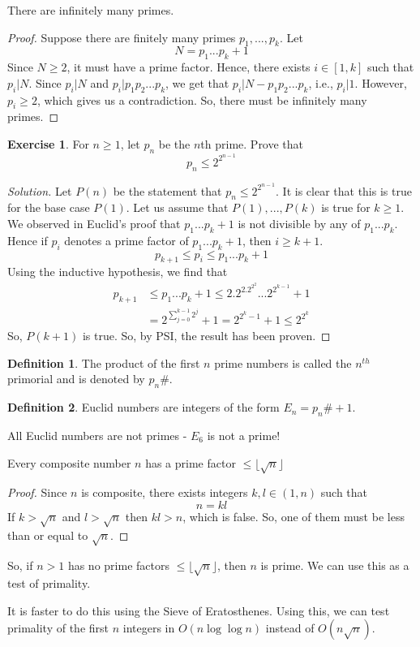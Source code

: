 \documentclass[12pt,letterpaper]{amsbook}
\theoremstyle{definition}
\newtheorem{definition}{Definition} %
\newtheorem*{exercise}{Exercise}
\newenvironment{solution}
  {\renewcommand\qedsymbol{$\blacksquare$}\begin{proof}[Solution]}
  {\end{proof}}
\begin{document}
\begin{theorem}[Euclid]
  There are infinitely many primes.  
\end{theorem}

\begin{proof}
  Suppose there are finitely many primes $p_1,...,p_k$. Let
  \[N = p_1...p_k + 1\]
  Since $N \geq 2$, it must have a prime factor. Hence, there exists $i \in [1,k]$ such that $p_i | N$. Since $p_i|N$ and $p_i|p_1p_2...p_k$, we get that $p_i|N-p_1p_2...p_k$, i.e., $p_i|1$. However, $p_i \geq 2$, which gives us a contradiction. So, there must be infinitely many primes.
\end{proof}

\begin{exercise}
  For $n \geq 1$, let $p_n$ be the $n$th prime. Prove that
  \[p_n \leq 2^{2^{n-1}}\]
\end{exercise}

\begin{solution}
  Let $P(n)$ be the statement that $p_n \leq 2^{2^{n-1}}$. It is clear that this is true for the base case $P(1)$. Let us assume that $P(1),...,P(k)$ is true for $k \geq 1$.
  We observed in Euclid's proof that $p_1...p_k+1$ is not divisible by any of $p_1...p_k$. Hence if $p_i$ denotes a prime factor of $p_1...p_k+1$, then $i \geq k+1$.
  \[p_{k+1} \leq p_i \leq p_1...p_k+1\]
  Using the inductive hypothesis, we find that
  \begin{align*}
    p_{k+1} &\leq p_1...p_k+1 \leq 2.2^2.2^{2^2}...2^{2^{k-1}}+1 \\
            &= 2^{\sum_{j=0}^{k-1} 2^j}+1 = 2^{2^k-1}+1 \leq 2^{2^k}
  \end{align*}
  So, $P(k+1)$ is true. So, by PSI, the result has been proven.
\end{solution}

\begin{definition}
  The product of the first $n$ prime numbers is called the $n^{th}$ primorial and is denoted by $p_n\#$.
\end{definition}

\begin{definition}
  Euclid numbers are integers of the form $E_n = p_n\# +1$. 
\end{definition}

All Euclid numbers are not primes - $E_6$ is not a prime!

\begin{theorem}
  Every composite number $n$ has a prime factor $\leq \lfloor \sqrt{n} \rfloor$
\end{theorem}

\begin{proof}
  Since $n$ is composite, there exists integers $k,l \in (1,n)$   such that 
  \[n = kl\]
  If $k > \sqrt{n}$ and $l > \sqrt{n}$ then $kl > n$, which is false. So, one of them must be less than or equal to $\sqrt{n}$.
\end{proof}

So, if $n > 1$ has no prime factors $\leq \lfloor \sqrt{n} \rfloor$, then $n$ is prime. We can use this as a test of primality.

It is faster to do this using the Sieve of Eratosthenes. Using this, we can test primality of the first $n$ integers in $O(n \log{\log{n}})$ instead of $O(n\sqrt{n})$.
\end{document}
